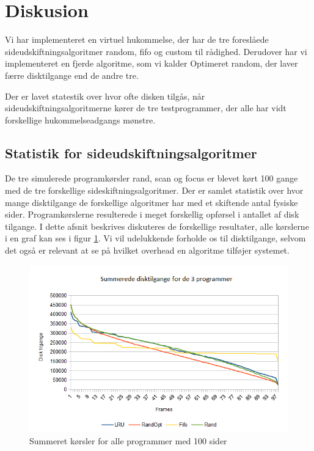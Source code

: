 \section{Diskusion}
\label{sec:diskusion}
Vi har implementeret en virtuel hukommelse, der har de tre foreslåede sideudskiftningsalgoritmer random, fifo og custom til rådighed. Derudover har vi implementeret en fjerde algoritme, som vi kalder Optimeret random, der laver færre disktilgange end de andre tre.

Der er lavet statestik over hvor ofte disken tilgås, når sideudskiftningsalgoritmerne kører de tre testprogrammer, der alle har vidt forskellige hukommelseadgangs mønstre. 

\subsection{Statistik for sideudskiftningsalgoritmer}
\label{subsec:statistik}
De tre simulerede programkørsler rand, scan og focus er blevet kørt 100 gange med de tre forskellige sideskiftningsalgoritmer. Der er samlet statistik over hvor mange disktilgange de forskellige algoritmer har med et skiftende antal fysiske sider. Programkørslerne resulterede i meget forskellig opførsel i antallet af disk tilgange. I dette afsnit beskrives diskuteres de forskellige resultater, alle kørslerne i en graf kan ses i figur \ref{fig:all}. Vi vil udelukkende forholde os til disktilgange, selvom det også er relevant at se på hvilket overhead en algoritme tilføjer systemet.


\begin{figure}[ht]
\centerline{\includegraphics[scale=0.8]{graph/stat_all}}
\caption{Summeret kørsler for alle programmer med 100 sider}
\label{fig:all}
\end{figure}

